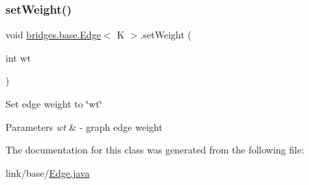 \subsubsection{\texorpdfstring{set\+Weight()}{setWeight()}}
{\footnotesize\ttfamily void \hyperlink{classbridges_1_1base_1_1_edge}{bridges.\+base.\+Edge}$<$ K $>$.set\+Weight (\begin{DoxyParamCaption}\item[{int}]{wt }\end{DoxyParamCaption})}

Set edge weight to \char`\"{}wt\char`\"{}


\begin{DoxyParams}{Parameters}
{\em wt} & -\/ graph edge weight \\
\hline
\end{DoxyParams}


The documentation for this class was generated from the following file\+:\begin{DoxyCompactItemize}
\item 
link/base/\hyperlink{_edge_8java}{Edge.\+java}\end{DoxyCompactItemize}
